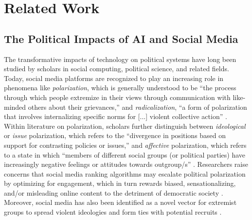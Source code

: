 \section{Related Work}\label{sec:related-work}

\subsection{The Political Impacts of AI and Social Media}\label{sec:radicalization-polarization}
The transformative impacts of technology on political systems have long been studied by scholars in social computing, political science, and related fields. Today, social media platforms are recognized to play an increasing role in phenomena like \textit{polarization}, which is generally understood to be ``the process through which people extremize in their views through communication with like-minded others about their grievances,'' and \textit{radicalization}, ``a form of polarization that involves internalizing specific norms for [...] violent collective action'' \cite{Smithetal2025PrimerOnPoliticization}. Within literature on polarization, scholars further distinguish between \textit{ideological} or \textit{issue} polarization, which refers to the ``divergence in positions based on support for contrasting policies or issues,'' and \textit{affective} polarization, which refers to a state in which ``members of different social groups (or political parties) have increasingly negative feelings or attitudes towards outgroup/s'' \cite{Smithetal2024PolarizationCollectiveEngagement}. Researchers raise concerns that social media ranking algorithms may escalate political polarization by optimizing for engagement, which in turn rewards biased, sensationalizing, and/or misleading online content to the detriment of democratic society \cite{Strayetal2023AlgorithmicManagement}. Moreover, social media has also been identified as a novel vector for extremist groups to spread violent ideologies and form ties with potential recruits \cite{LeapAndYoung2021RadicalizationAndDeradicalization}.

